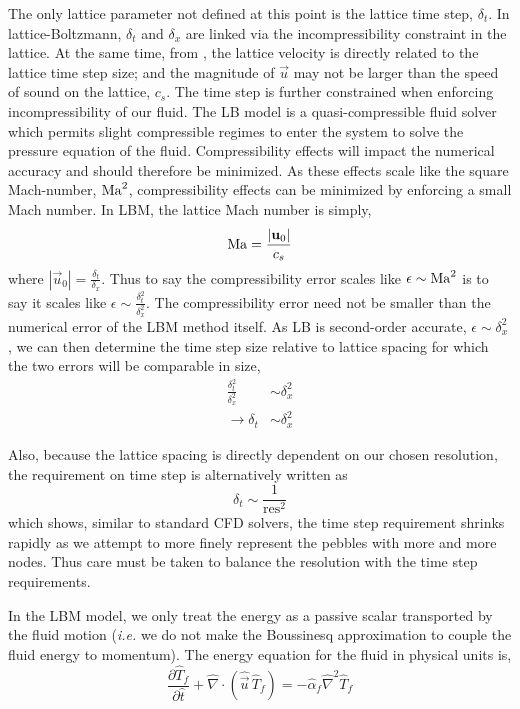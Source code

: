 The only lattice parameter not defined at this point is the lattice time step, $\delta_t$. In lattice-Boltzmann, $\delta_t$ and $\delta_x$ are linked via the incompressibility constraint in the lattice. At the same time, from , the lattice velocity is directly related to the lattice time step size; and the magnitude of $\vec{u}$ may not be larger than the speed of sound on the lattice, $c_s$. The time step is further constrained when enforcing incompressibility of our fluid. The LB model is a quasi-compressible fluid solver which permits slight compressible regimes to enter the system to solve the pressure equation of the fluid. Compressibility effects will impact the numerical accuracy and should therefore be minimized. As these effects scale like the square Mach-number, $\mathrm{Ma}^2$, compressibility effects can be minimized by enforcing a small Mach number. In LBM, the lattice Mach number is simply,
\begin{equation}
 	\mathrm{Ma} = \frac{|\mathbf{u}_0|}{c_s}
\end{equation}
where $|\vec{u}_0| = \frac{\delta_t}{\delta_x}$. Thus to say the compressibility error scales like $\epsilon \sim \mathrm{Ma}^2$ is to say it scales like $\epsilon \sim \frac{\delta_t^2}{\delta_x^2}$. The compressibility error need not be smaller than the numerical error of the LBM method itself. As LB is second-order accurate\cite{succi2001lattice}, $\epsilon \sim \delta_x^2$, we can then determine the time step size relative to lattice spacing for which the two errors will be comparable in size,
\begin{align*}
	\frac{\delta_t^2}{\delta_x^2} &\sim \delta_x^2\\
	\rightarrow \delta_t &\sim \delta_x^2
\end{align*}

Also, because the lattice spacing is directly dependent on our chosen resolution, the requirement on time step is alternatively written as
\begin{equation}
	\delta_t \sim \frac{1}{\text{res}^2}
\end{equation}
which shows, similar to standard CFD solvers, the time step requirement shrinks rapidly as we attempt to more finely represent the pebbles with more and more nodes. Thus care must be taken to balance the resolution with the time step requirements.

In the LBM model, we only treat the energy as a passive scalar transported by the fluid motion (\textit{i.e.} we do not make the Boussinesq approximation to couple the fluid energy to momentum). The energy equation for the fluid in physical units is,
\begin{equation}
	\frac{\partial \hat{T}_f}{\partial \hat{t}} + \hat{\nabla}\cdot(\hat{\vec{u}}\,\hat{T}_f) = -\hat{\alpha}_f\hat{\nabla}^2\hat{T}_f
\end{equation}

